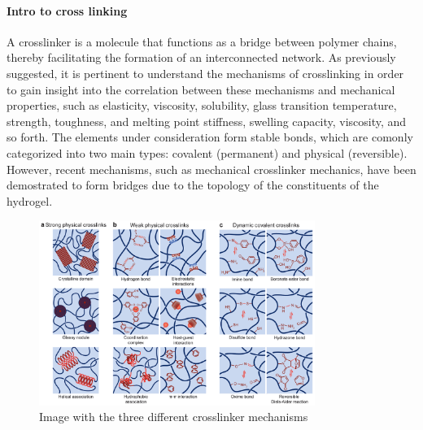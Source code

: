 \paragraph{Intro to cross linking}
A crosslinker is a molecule that functions as a bridge between polymer chains, thereby facilitating the formation of an interconnected network.
As previously suggested, it is pertinent to understand the mechanisms of crosslinking in order to gain insight into the correlation between these mechanisms and mechanical properties, such as elasticity, viscosity, solubility, glass transition temperature, strength, toughness, and melting point stiffness, swelling capacity, viscosity, and so forth\citep{priyaComprehensiveReviewHydrogel2024}.
The elements under consideration form stable bonds, which are comonly categorized into two main types: covalent (permanent) and physical (reversible)\citep{bustamantetorresHydrogelsClassificationAccording2021}.
However, recent mechanisms, such as mechanical crosslinker mechanics, have been demostrated to form bridges due to the topology of the constituents of the hydrogel.

\begin{figure}[!ht]
    \centering
    \includegraphics[width=0.8\textwidth]{figs/crosslinker_mechanisms.png}
    \caption{Image with the three different crosslinker mechanisms}
\end{figure}

